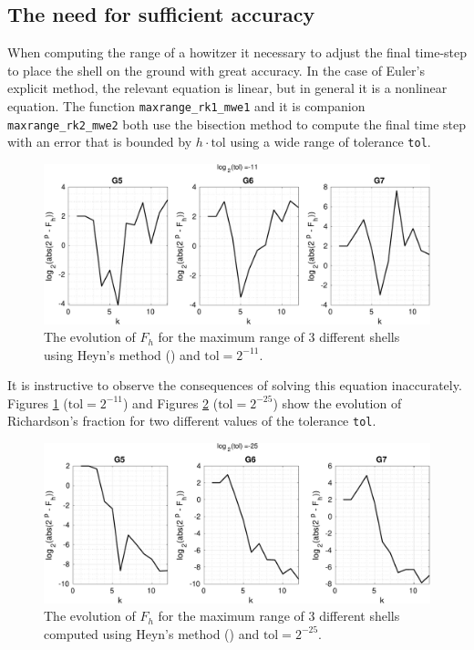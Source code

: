 \documentclass[runningheads]{llncs}
\begin{document}
\subsection{The need for sufficient accuracy}

When computing the range of a howitzer it necessary to adjust the final time-step to place the shell on the ground with great accuracy. In the case of Euler's explicit method, the relevant equation is linear, but in general it is a nonlinear equation. The function {\tt maxrange\_rk1\_mwe1} and it is companion {\tt maxrange\_rk2\_mwe2} both use the bisection method to compute the final time step with an error that is bounded by $h\cdot\text{tol}$ using a wide range of tolerance {\tt tol}.
\begin{figure}
  \includegraphics[width=\linewidth]{maxrange_rk2_tol11.pdf} \caption{The evolution of $F_h$ for the maximum range of 3 different shells using Heyn's method () and $\text{tol} = 2^{-11}$.}
  \label{fig:maxrange_rk2_tol11}
\end{figure}
It is instructive to observe the consequences of solving this equation inaccurately. Figures \ref{fig:maxrange_rk2_tol11} ($\text{tol} = 2^{-11}$) and Figures \ref{fig:maxrange_rk2_tol25} ($\text{tol} = 2^{-25}$) show the evolution of Richardson's fraction for two different values of the tolerance {\tt tol}.
\begin{figure}
  \includegraphics[width=\linewidth]{maxrange_rk2_tol25.pdf} \caption{The evolution of $F_h$ for the maximum range of 3 different shells computed using Heyn's method () and $\text{tol} = 2^{-25}$.}
  \label{fig:maxrange_rk2_tol25}
\end{figure}
\end{document}
